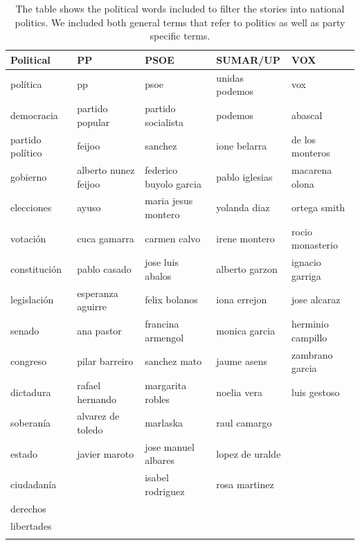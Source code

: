 \documentclass[12pt]{article}
\begin{document}
	\begin{longtable}{|l|l|l|l|l|}
		\hline
		\textbf{Political} & \textbf{PP} & \textbf{PSOE} & \textbf{SUMAR/UP} & \textbf{VOX} \\
		\hline
		política & pp & psoe & unidas podemos & vox \\
		democracia & partido popular & partido socialista & podemos & abascal \\
		partido político & feijoo & sanchez & ione belarra &de los monteros \\
		gobierno & alberto nunez feijoo & federico buyolo garcia & pablo iglesias & macarena olona \\
		elecciones & ayuso & maria jesus montero & yolanda diaz & ortega smith \\
		votación & cuca gamarra & carmen calvo & irene montero & rocio monasterio \\
		constitución & pablo casado & jose luis abalos & alberto garzon & ignacio garriga \\
		legislación & esperanza aguirre & felix bolanos & iona errejon &jose alcaraz \\
		senado & ana pastor & francina armengol & monica garcia & herminio campillo \\
		congreso & pilar barreiro & sanchez mato & jaume asens & zambrano garcia \\
		dictadura & rafael hernando & margarita robles & noelia vera & luis gestoso \\
		soberanía &alvarez de toledo & marlaska & raul camargo & \\
		estado & javier maroto & jose manuel albares &lopez de uralde & \\
		ciudadanía &  & isabel rodriguez & rosa martinez & \\
		derechos &  &  &  & \\
		libertades &  &  &  & \\
		\hline
		\caption{The table shows the political words included to filter the stories into national politics. We included both general terms that refer to politics as well as party specific terms.}
		\label{table:politics}
	\end{longtable}
	
	
	
\end{document}
